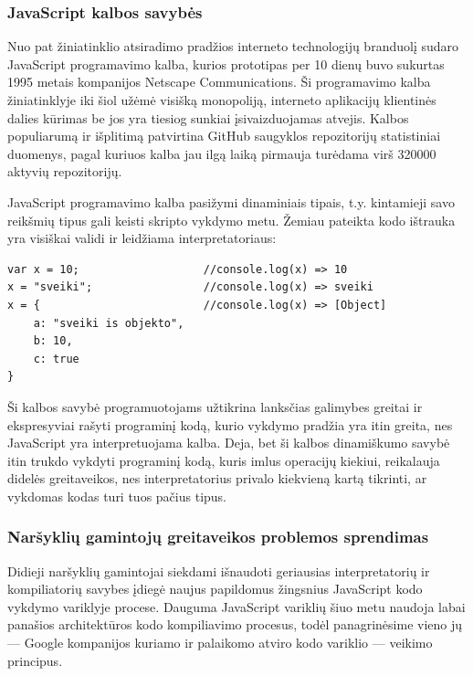\documentclass{VUMIFPSkursinis}
\begin{document}
\subsubsection{JavaScript kalbos savybės}

Nuo pat žiniatinklio atsiradimo pradžios interneto technologijų branduolį sudaro JavaScript programavimo kalba, kurios prototipas per 10 dienų buvo sukurtas 1995 metais kompanijos Netscape Communications. Ši programavimo kalba žiniatinklyje iki šiol užėmė visišką monopoliją, interneto aplikacijų klientinės dalies kūrimas be jos yra tiesiog sunkiai įsivaizduojamas atvejis. Kalbos populiarumą ir išplitimą patvirtina GitHub saugyklos repozitorijų statistiniai duomenys, pagal kuriuos kalba jau ilgą laiką pirmauja turėdama virš 320000 aktyvių repozitorijų. \cite{GIT19}


JavaScript programavimo kalba pasižymi dinaminiais tipais, t.y. kintamieji savo reikšmių tipus gali keisti skripto vykdymo metu. Žemiau pateikta kodo ištrauka yra visiškai validi ir leidžiama interpretatoriaus:

\begin{center}
\begin{small}
\begin{verbatim}
var x = 10;                   //console.log(x) => 10
x = "sveiki";                 //console.log(x) => sveiki
x = {                         //console.log(x) => [Object]
    a: "sveiki is objekto",
    b: 10,
    c: true
}
\end{verbatim}
\end{small}
\end{center}

Ši kalbos savybė programuotojams užtikrina lanksčias galimybes greitai ir ekspresyviai rašyti programinį kodą, kurio vykdymo pradžia yra itin greita, nes JavaScript yra interpretuojama kalba. Deja, bet ši kalbos dinamiškumo savybė itin trukdo vykdyti programinį kodą, kuris imlus operacijų kiekiui, reikalauja didelės greitaveikos, nes interpretatorius privalo kiekvieną kartą tikrinti, ar vykdomas kodas turi tuos pačius tipus. \cite{LCW17}

\subsubsection{Naršyklių gamintojų greitaveikos problemos sprendimas}

Didieji naršyklių gamintojai siekdami išnaudoti geriausias interpretatorių ir kompiliatorių savybes įdiegė naujus papildomus žingsnius JavaScript kodo vykdymo variklyje procese. Dauguma JavaScript variklių šiuo metu naudoja labai panašios architektūros kodo kompiliavimo procesus, todėl panagrinėsime vieno jų — Google kompanijos kuriamo ir palaikomo atviro kodo variklio — veikimo principus.
\end{document}
